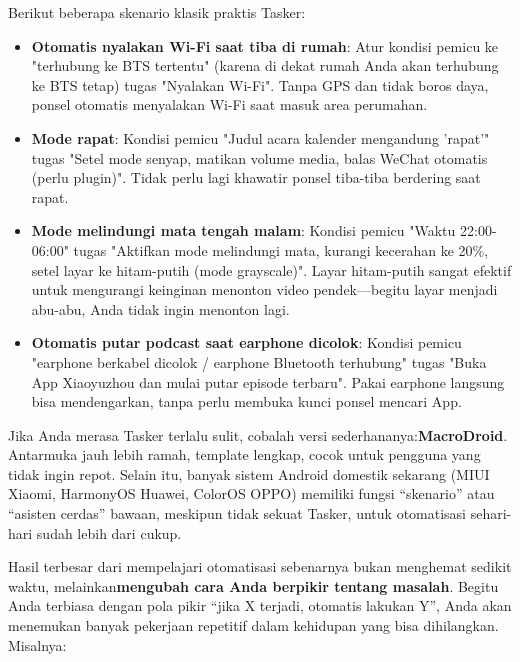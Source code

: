 Berikut beberapa skenario klasik praktis Tasker:

\begin{itemize}
  \item \textbf{Otomatis nyalakan Wi-Fi saat tiba di rumah}: Atur kondisi pemicu ke "terhubung ke BTS tertentu" (karena di dekat rumah Anda akan terhubung ke BTS tetap) tugas "Nyalakan Wi-Fi". Tanpa GPS dan tidak boros daya, ponsel otomatis menyalakan Wi-Fi saat masuk area perumahan.
  \item \textbf{Mode rapat}: Kondisi pemicu "Judul acara kalender mengandung 'rapat'" tugas "Setel mode senyap, matikan volume media, balas WeChat otomatis (perlu plugin)". Tidak perlu lagi khawatir ponsel tiba-tiba berdering saat rapat.
  \item \textbf{Mode melindungi mata tengah malam}: Kondisi pemicu "Waktu 22:00-06:00" tugas "Aktifkan mode melindungi mata, kurangi kecerahan ke 20\%, setel layar ke hitam-putih (mode grayscale)". Layar hitam-putih sangat efektif untuk mengurangi keinginan menonton video pendek—begitu layar menjadi abu-abu, Anda tidak ingin menonton lagi.
  \item \textbf{Otomatis putar podcast saat earphone dicolok}: Kondisi pemicu "earphone berkabel dicolok / earphone Bluetooth terhubung" tugas "Buka App Xiaoyuzhou dan mulai putar episode terbaru". Pakai earphone langsung bisa mendengarkan, tanpa perlu membuka kunci ponsel mencari App.
\end{itemize}

Jika Anda merasa Tasker terlalu sulit, cobalah versi sederhananya:\textbf{MacroDroid}. Antarmuka jauh lebih ramah, template lengkap, cocok untuk pengguna yang tidak ingin repot. Selain itu, banyak sistem Android domestik sekarang (MIUI Xiaomi, HarmonyOS Huawei, ColorOS OPPO) memiliki fungsi “skenario” atau “asisten cerdas” bawaan, meskipun tidak sekuat Tasker, untuk otomatisasi sehari-hari sudah lebih dari cukup.


Hasil terbesar dari mempelajari otomatisasi sebenarnya bukan menghemat sedikit waktu, melainkan\textbf{mengubah cara Anda berpikir tentang masalah}. Begitu Anda terbiasa dengan pola pikir “jika X terjadi, otomatis lakukan Y”, Anda akan menemukan banyak pekerjaan repetitif dalam kehidupan yang bisa dihilangkan. Misalnya:

